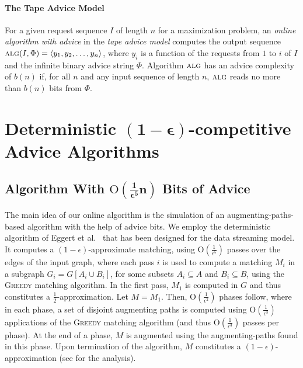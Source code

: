 \documentclass[a4paper]{article}
\newcommand{\Order}{\mathrm{O}}
\newcommand{\ALG}{\textsc{alg}}
\newcommand{\alg}{\ALG}
\begin{document}
\paragraph*{The Tape Advice Model} For a given request sequence $I$ of length $n$ for a maximization problem,
an \emph{online algorithm with advice} in the \emph{tape advice model} computes the output sequence
$\alg(I,\Phi) = \left<y_1,y_2,\ldots,y_n\right>$, where $y_i$ is a function of the requests from $1$ to
$i$ of $I$ and the infinite binary advice string $\Phi$. Algorithm $\alg$ has an advice complexity of $b(n)$ if,
for all $n$ and any input sequence of length $n$, $\alg$ reads no more than $b(n)$ bits from $\Phi$.




\section{Deterministic $\mathbf{(1-\epsilon)}$-competitive Advice Algorithms} \label{sec:one-minus-eps}



\subsection{Algorithm With $\mathbf{\Order(\frac{1}{\epsilon^5} n)}$ Bits of Advice}



The main idea of our online algorithm is the simulation of an augmenting-paths-based algorithm
with the help of advice bits. We employ the deterministic algorithm of Eggert et al.~\cite{ekms11} that has
been designed for the data streaming model. It computes a $(1-\epsilon)$-approximate
matching, using $\Order(\frac{1}{\epsilon^5})$ passes over the edges of the input graph, where each pass $i$
is used to compute a matching $M_i$ in a subgraph $G_i = G[A_i \cup B_i]$, for
some subsets $A_i \subseteq A$ and $B_i \subseteq B$, using the \textsc{Greedy}
matching algorithm.
In the first pass, $M_1$ is computed in $G$ and thus constitutes a $\frac{1}{2}$-approximation.
Let $M = M_1$.
Then, $\Order(\frac{1}{\epsilon^2})$ phases follow, where in each phase, a set of disjoint augmenting
paths is computed using $\Order(\frac{1}{\epsilon^3})$ applications of the \textsc{Greedy} matching
algorithm (and thus $\Order(\frac{1}{\epsilon^3})$ passes per phase).
At the end of a phase, $M$ is augmented using the augmenting-paths found in this phase. Upon
termination of the algorithm, $M$ constitutes a $(1-\epsilon)$-approximation (see \cite{ekms11} for
the analysis).
\end{document}
